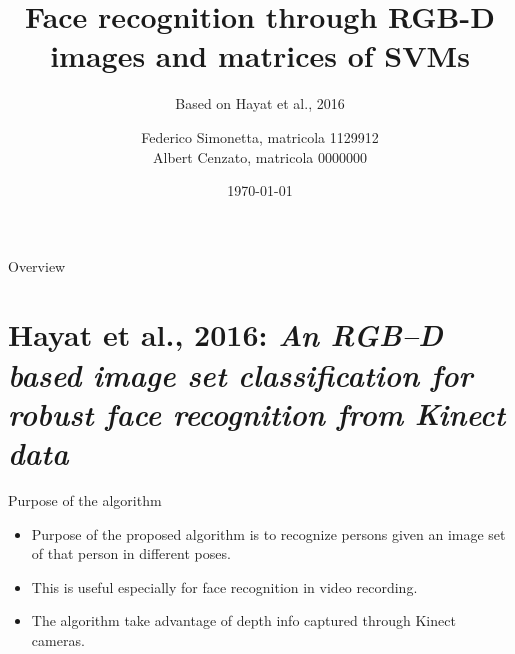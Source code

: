 \documentclass{beamer}
\title{Face recognition through RGB-D images and matrices of SVMs} %
\subtitle{Based on Hayat et al., 2016}
\date{\today}
\author{Federico Simonetta, matricola 1129912 \\[1ex] Albert Cenzato, matricola 0000000 }
\begin{document}
\maketitle
{}

\begin{frame}{Overview}
	\vspace*{6mm}
\end{frame}

\section{Hayat et al., 2016: \textit{An RGB–D based image set classification
for robust face recognition from Kinect data}}
\begin{frame}{Purpose of the algorithm}
	\begin{itemize}
		\item Purpose of the proposed algorithm is to recognize persons
			given an image set of that person in different poses.
		\item This is useful especially for face recognition in video
			recording.
		\item The algorithm take advantage of depth info captured
			through Kinect cameras.
	\end{itemize}

\end{frame}
\end{document}
